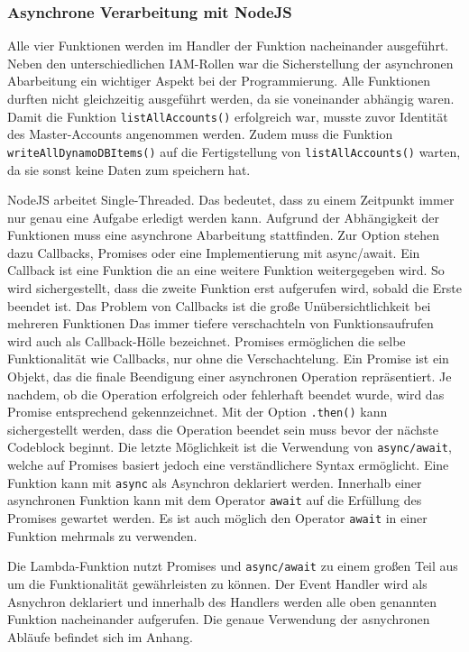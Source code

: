 \subsubsection{Asynchrone Verarbeitung mit NodeJS}

Alle vier Funktionen werden im Handler der Funktion nacheinander ausgeführt.
Neben den unterschiedlichen IAM-Rollen war die Sicherstellung der asynchronen Abarbeitung ein wichtiger Aspekt bei der Programmierung.
Alle Funktionen durften nicht gleichzeitig ausgeführt werden, da sie voneinander abhängig waren.
Damit die Funktion \verb+listAllAccounts()+ erfolgreich war, musste zuvor Identität des Master-Accounts angenommen werden.
Zudem muss die Funktion \verb+writeAllDynamoDBItems()+ auf die Fertigstellung von \verb+listAllAccounts()+ warten, da sie sonst keine Daten zum speichern hat.

NodeJS arbeitet Single-Threaded.
Das bedeutet, dass zu einem Zeitpunkt immer nur genau eine Aufgabe erledigt werden kann.
Aufgrund der Abhängigkeit der Funktionen muss eine asynchrone Abarbeitung stattfinden.
Zur Option stehen dazu Callbacks, Promises oder eine Implementierung mit async/await.
Ein Callback ist eine Funktion die an eine weitere Funktion weitergegeben wird.
So wird sichergestellt, dass die zweite Funktion erst aufgerufen wird, sobald die Erste beendet ist.
Das Problem von Callbacks ist die große Unübersichtlichkeit bei mehreren Funktionen
Das immer tiefere verschachteln von Funktionsaufrufen wird auch als \glqq Callback-Hölle\grqq{} bezeichnet.
Promises ermöglichen die selbe Funktionalität wie Callbacks, nur ohne die Verschachtelung.
\glqq Ein Promise ist ein Objekt, das die finale Beendigung einer asynchronen Operation repräsentiert.
Je nachdem, ob die Operation erfolgreich oder fehlerhaft beendet wurde, wird das Promise entsprechend gekennzeichnet. \grqq{} \cite[]{Promises}
Mit der Option \verb+.then()+ kann sichergestellt werden, dass die Operation beendet sein muss bevor der nächste Codeblock beginnt.
Die letzte Möglichkeit ist die Verwendung von \verb+async/await+, welche auf Promises basiert jedoch eine verständlichere Syntax ermöglicht.
Eine Funktion kann mit \verb+async+ als Asynchron deklariert werden.
Innerhalb einer asynchronen Funktion kann mit dem Operator \verb+await+ auf die Erfüllung des Promises gewartet werden.
Es ist auch möglich den Operator \verb+await+ in einer Funktion mehrmals zu verwenden.

Die Lambda-Funktion nutzt Promises und \verb+async/await+ zu einem großen Teil aus um die Funktionalität gewährleisten zu können.
Der Event Handler wird als Asnychron deklariert und innerhalb des Handlers werden alle oben genannten Funktion nacheinander aufgerufen.
Die genaue Verwendung der asnychronen Abläufe befindet sich im Anhang.


